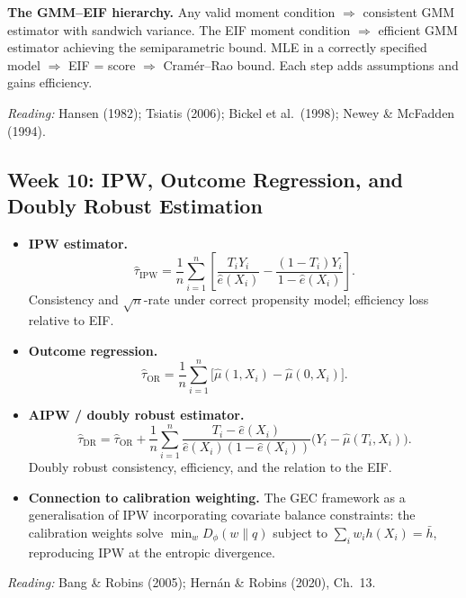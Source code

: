 \documentclass[12pt]{article}
\begin{document}
\begin{keybox}
\noindent\textbf{The GMM--EIF hierarchy.}
Any valid moment condition $\Rightarrow$ consistent GMM estimator with
sandwich variance.  The EIF moment condition $\Rightarrow$ efficient
GMM estimator achieving the semiparametric bound.  MLE in a correctly
specified model $\Rightarrow$ EIF = score $\Rightarrow$ Cram\'er--Rao
bound.  Each step adds assumptions and gains efficiency.
\end{keybox}

\noindent\textit{Reading:} Hansen (1982); Tsiatis (2006);
Bickel et al.\ (1998); Newey \& McFadden (1994).

\subsection{Week 10: IPW, Outcome Regression, and Doubly Robust Estimation}

\begin{itemize}
  \item \textbf{IPW estimator.}
    \[
      \hat\tau_{\mathrm{IPW}} = \frac{1}{n}\sum_{i=1}^n \left[
        \frac{T_i Y_i}{\hat e(X_i)} - \frac{(1-T_i)Y_i}{1-\hat e(X_i)}
      \right].
    \]
    Consistency and $\sqrt{n}$-rate under correct propensity model;
    efficiency loss relative to EIF.

  \item \textbf{Outcome regression.}
    \[
      \hat\tau_{\mathrm{OR}} = \frac{1}{n}\sum_{i=1}^n
        \bigl[\hat\mu(1, X_i) - \hat\mu(0, X_i)\bigr].
    \]

  \item \textbf{AIPW / doubly robust estimator.}
    \[
      \hat\tau_{\mathrm{DR}} = \hat\tau_{\mathrm{OR}}
        + \frac{1}{n}\sum_{i=1}^n
          \frac{T_i - \hat e(X_i)}{\hat e(X_i)(1-\hat e(X_i))}
          \bigl(Y_i - \hat\mu(T_i, X_i)\bigr).
    \]
    Doubly robust consistency, efficiency, and the relation to the EIF.

  \item \textbf{Connection to calibration weighting.}
    The GEC framework as a generalisation of IPW incorporating
    covariate balance constraints: the calibration weights solve
    $\min_w D_\phi(w \| q)$ subject to $\sum_i w_i h(X_i) = \bar h$,
    reproducing IPW at the entropic divergence.
\end{itemize}

\noindent\textit{Reading:} Bang \& Robins (2005);
Hern\'an \& Robins (2020), Ch.~13.
\end{document}

